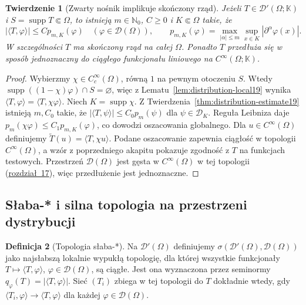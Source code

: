 \documentclass[11pt,a4paper]{article}
\numberwithin{equation}{section}
\theoremstyle{plain}
\newtheorem{twierdzenie}{Twierdzenie}[section]
\theoremstyle{definition}
\newtheorem{definicja}[twierdzenie]{Definicja}
\theoremstyle{remark}
\newcommand{\N}{\mathbb N}
\newcommand{\K}{\mathbb K}
\DeclareMathOperator{\supp}{supp}
\begin{document}
\begin{twierdzenie}[Zwarty nośnik implikuje skończony rząd]
\label{thm:compact-support-order19}
Jeżeli $T\in\mathcal D'(\Omega;\K)$ i
$S=\supp T\Subset\Omega$, to istnieją
$m\in\N_0$, $C\ge0$ i $K\Subset\Omega$ takie, że
\[|\langle T,\varphi\rangle|\le C p_{m,K}(\varphi)
\quad(\varphi\in\mathcal D(\Omega)),\qquad
p_{m,K}(\varphi)=\max_{|\alpha|\le m}
\sup_{x\in K}|\partial^\alpha\varphi(x)|.\]
W szczególności $T$ ma skończony rząd na całej $\Omega$.
Ponadto $T$ przedłuża się w sposób jednoznaczny do
ciągłego funkcjonału liniowego na $C^\infty(\Omega;\K)$.
\end{twierdzenie}
\begin{proof}
Wybierzmy $\chi\in C_c^\infty(\Omega)$, równą $1$
na pewnym otoczeniu $S$. Wtedy
$\supp((1-\chi)\varphi)\cap S=\varnothing$, więc z
Lematu~\ref{lem:distribution-local19} wynika
$\langle T,\varphi\rangle=\langle T,\chi\varphi\rangle$.
Niech $K=\supp\chi$. Z Twierdzenia~\ref{thm:distribution-estimate19}
istnieją $m,C_0$ takie, że
$|\langle T,\psi\rangle|\le C_0p_m(\psi)$ dla
$\psi\in\mathcal D_K$. Reguła Leibniza daje
$p_m(\chi\varphi)\le C_1p_{m,K}(\varphi)$,
co dowodzi oszacowania globalnego.
Dla $u\in C^\infty(\Omega)$ definiujemy
$\widetilde T(u)=\langle T,\chi u\rangle$.
Podane oszacowanie zapewnia ciągłość w topologii
$C^\infty(\Omega)$, a wzór z poprzedniego akapitu
pokazuje zgodność z $T$ na funkcjach testowych.
Przestrzeń $\mathcal D(\Omega)$ jest gęsta w
$C^\infty(\Omega)$ w tej topologii (\hyperref[sec:gladkie-schwartz17]{rozdział~17}),
więc przedłużenie jest jednoznaczne.
\end{proof}

\subsection{Słaba-* i silna topologia na przestrzeni dystrybucji}

\begin{definicja}[Topologia słaba-*]
\label{def:weakstar19}
Na $\mathcal D'(\Omega)$ definiujemy
$\sigma(\mathcal D'(\Omega),\mathcal D(\Omega))$ jako
najsłabszą lokalnie wypukłą topologię, dla której
wszystkie funkcjonały $T\mapsto\langle T,\varphi\rangle$,
$\varphi\in\mathcal D(\Omega)$, są ciągłe.
Jest ona wyznaczona przez seminormy
$q_\varphi(T)=|\langle T,\varphi\rangle|$.
Sieć $(T_i)$ zbiega w tej topologii do $T$ dokładnie wtedy,
gdy $\langle T_i,\varphi\rangle\to\langle T,\varphi\rangle$
dla każdej $\varphi\in\mathcal D(\Omega)$.
\end{definicja}
\end{document}
